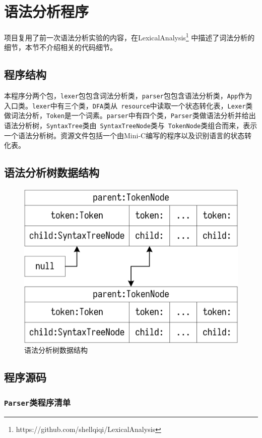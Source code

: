 \section{语法分析程序}
项目复用了前一次语法分析实验的内容，在LexicalAnalysis\footnote{https://github.com/shellqiqi/LexicalAnalysis} 中描述了词法分析的细节，本节不介绍相关的代码细节。
\subsection{程序结构}
本程序分两个包，\verb|lexer|包包含词法分析类，\verb|parser|包包含语法分析类，\verb|App|作为入口类。\verb|lexer|中有三个类，\verb|DFA|类从~\verb|resource|中读取一个状态转化表，\verb|Lexer|类做词法分析，\verb|Token|是一个词素。\verb|parser|中有四个类，\verb|Parser|类做语法分析并给出语法分析树，\verb|SyntaxTree|类由~\verb|SyntaxTreeNode|类与~\verb|TokenNode|类组合而来，表示一个语法分析树。资源文件包括一个由Mini-C编写的程序以及识别语言的状态转化表。
\subsection{语法分析树数据结构}
\begin{figure}[htbp]
    \centering
    \includegraphics{../assets/SyntaxTree.png}
    \caption{语法分析树数据结构}
\end{figure}
\subsection{程序源码}
\subsubsection{\texttt{Parser}类程序清单}
{\linespread{1}
}
